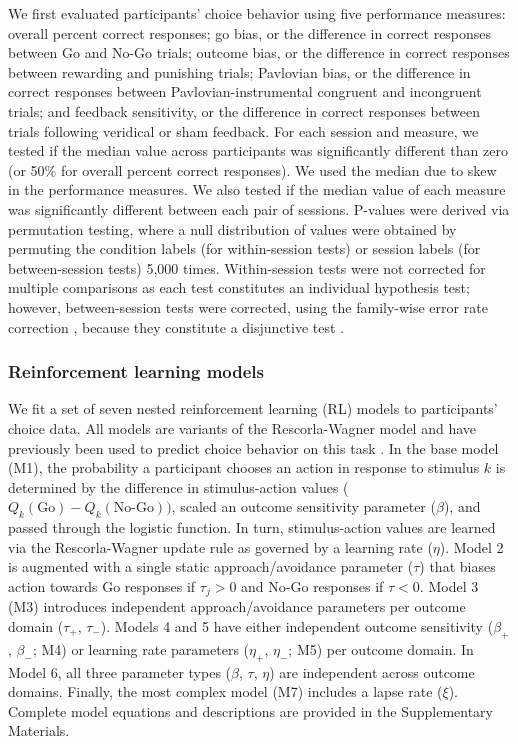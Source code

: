\documentclass[a4paper,12pt]{article}
\begin{document}
\begin{refsection}[main]
We first evaluated participants' choice behavior using five performance measures: overall percent correct responses; go bias, or the difference in correct responses between Go and No-Go trials; outcome bias, or the difference in correct responses between rewarding and punishing trials; Pavlovian bias, or the difference in correct responses between Pavlovian-instrumental congruent and incongruent trials; and feedback sensitivity, or the difference in correct responses between trials following veridical or sham feedback. For each session and measure, we tested if the median value across participants was significantly different than zero (or 50\% for overall percent correct responses). We used the median due to skew in the performance measures. We also tested if the median value of each measure was significantly different between each pair of sessions. P-values were derived via permutation testing, where a null distribution of values were obtained by permuting the condition labels (for within-session tests) or session labels (for between-session tests) 5,000 times. Within-session tests were not corrected for multiple comparisons as each test constitutes an individual hypothesis test; however, between-session tests were corrected, using the family-wise error rate correction \cite{winkler2014permutation}, because they constitute a disjunctive test \cite{rubin2021adjust}.

\subsubsection*{Reinforcement learning models}

We fit a set of seven nested reinforcement learning (RL) models to participants' choice data. All models are variants of the Rescorla-Wagner model and have previously been used to predict choice behavior on this task \cite{guitart2012go, mkrtchian2017modeling, moutoussis2018change, swart2017catecholaminergic}. In the base model (M1), the probability a participant chooses an action in response to stimulus $k$ is determined by the difference in stimulus-action values ($Q_k(\text{Go}) - Q_k(\text{No-Go}))$, scaled an outcome sensitivity parameter ($\beta$), and passed through the logistic function. In turn, stimulus-action values are learned via the Rescorla-Wagner update rule as governed by a learning rate ($\eta$). Model 2 is augmented with a single static approach/avoidance parameter ($\tau$) that biases action towards Go responses if $\tau_j > 0$ and No-Go responses if $\tau < 0$. Model 3 (M3) introduces independent approach/avoidance parameters per outcome domain ($\tau_+$, $\tau_-$). Models 4 and 5 have either independent outcome sensitivity ($\beta_+$, $\beta_-$; M4) or learning rate parameters ($\eta_+$, $\eta_-$; M5) per outcome domain. In Model 6, all three parameter types ($\beta$, $\tau$, $\eta$) are independent across outcome domains. Finally, the most complex model (M7) includes a lapse rate ($\xi$). Complete model equations and descriptions are provided in the Supplementary Materials.


\end{refsection}
\end{document}
